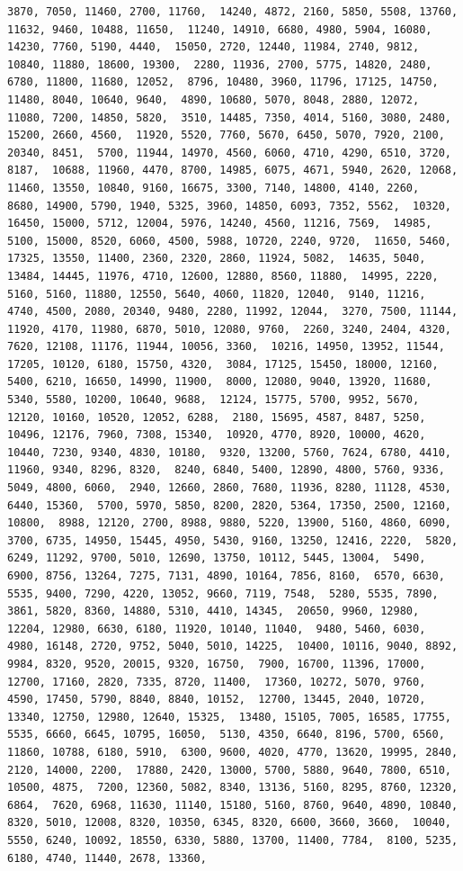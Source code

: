 \documentclass[
]{article}
\begin{document}
\begin{verbatim}
3870, 7050, 11460, 2700, 11760,  14240, 4872, 2160, 5850, 5508, 13760, 11632, 9460, 10488, 11650,  11240, 14910, 6680, 4980, 5904, 16080, 14230, 7760, 5190, 4440,  15050, 2720, 12440, 11984, 2740, 9812, 10840, 11880, 18600, 19300,  2280, 11936, 2700, 5775, 14820, 2480, 6780, 11800, 11680, 12052,  8796, 10480, 3960, 11796, 17125, 14750, 11480, 8040, 10640, 9640,  4890, 10680, 5070, 8048, 2880, 12072, 11080, 7200, 14850, 5820,  3510, 14485, 7350, 4014, 5160, 3080, 2480, 15200, 2660, 4560,  11920, 5520, 7760, 5670, 6450, 5070, 7920, 2100, 20340, 8451,  5700, 11944, 14970, 4560, 6060, 4710, 4290, 6510, 3720, 8187,  10688, 11960, 4470, 8700, 14985, 6075, 4671, 5940, 2620, 12068,  11460, 13550, 10840, 9160, 16675, 3300, 7140, 14800, 4140, 2260,  8680, 14900, 5790, 1940, 5325, 3960, 14850, 6093, 7352, 5562,  10320, 16450, 15000, 5712, 12004, 5976, 14240, 4560, 11216, 7569,  14985, 5100, 15000, 8520, 6060, 4500, 5988, 10720, 2240, 9720,  11650, 5460, 17325, 13550, 11400, 2360, 2320, 2860, 11924, 5082,  14635, 5040, 13484, 14445, 11976, 4710, 12600, 12880, 8560, 11880,  14995, 2220, 5160, 5160, 11880, 12550, 5640, 4060, 11820, 12040,  9140, 11216, 4740, 4500, 2080, 20340, 9480, 2280, 11992, 12044,  3270, 7500, 11144, 11920, 4170, 11980, 6870, 5010, 12080, 9760,  2260, 3240, 2404, 4320, 7620, 12108, 11176, 11944, 10056, 3360,  10216, 14950, 13952, 11544, 17205, 10120, 6180, 15750, 4320,  3084, 17125, 15450, 18000, 12160, 5400, 6210, 16650, 14990, 11900,  8000, 12080, 9040, 13920, 11680, 5340, 5580, 10200, 10640, 9688,  12124, 15775, 5700, 9952, 5670, 12120, 10160, 10520, 12052, 6288,  2180, 15695, 4587, 8487, 5250, 10496, 12176, 7960, 7308, 15340,  10920, 4770, 8920, 10000, 4620, 10440, 7230, 9340, 4830, 10180,  9320, 13200, 5760, 7624, 6780, 4410, 11960, 9340, 8296, 8320,  8240, 6840, 5400, 12890, 4800, 5760, 9336, 5049, 4800, 6060,  2940, 12660, 2860, 7680, 11936, 8280, 11128, 4530, 6440, 15360,  5700, 5970, 5850, 8200, 2820, 5364, 17350, 2500, 12160, 10800,  8988, 12120, 2700, 8988, 9880, 5220, 13900, 5160, 4860, 6090,  3700, 6735, 14950, 15445, 4950, 5430, 9160, 13250, 12416, 2220,  5820, 6249, 11292, 9700, 5010, 12690, 13750, 10112, 5445, 13004,  5490, 6900, 8756, 13264, 7275, 7131, 4890, 10164, 7856, 8160,  6570, 6630, 5535, 9400, 7290, 4220, 13052, 9660, 7119, 7548,  5280, 5535, 7890, 3861, 5820, 8360, 14880, 5310, 4410, 14345,  20650, 9960, 12980, 12204, 12980, 6630, 6180, 11920, 10140, 11040,  9480, 5460, 6030, 4980, 16148, 2720, 9752, 5040, 5010, 14225,  10400, 10116, 9040, 8892, 9984, 8320, 9520, 20015, 9320, 16750,  7900, 16700, 11396, 17000, 12700, 17160, 2820, 7335, 8720, 11400,  17360, 10272, 5070, 9760, 4590, 17450, 5790, 8840, 8840, 10152,  12700, 13445, 2040, 10720, 13340, 12750, 12980, 12640, 15325,  13480, 15105, 7005, 16585, 17755, 5535, 6660, 6645, 10795, 16050,  5130, 4350, 6640, 8196, 5700, 6560, 11860, 10788, 6180, 5910,  6300, 9600, 4020, 4770, 13620, 19995, 2840, 2120, 14000, 2200,  17880, 2420, 13000, 5700, 5880, 9640, 7800, 6510, 10500, 4875,  7200, 12360, 5082, 8340, 13136, 5160, 8295, 8760, 12320, 6864,  7620, 6968, 11630, 11140, 15180, 5160, 8760, 9640, 4890, 10840,  8320, 5010, 12008, 8320, 10350, 6345, 8320, 6600, 3660, 3660,  10040, 5550, 6240, 10092, 18550, 6330, 5880, 13700, 11400, 7784,  8100, 5235, 6180, 4740, 11440, 2678, 13360, 
\end{verbatim}
\end{document}
